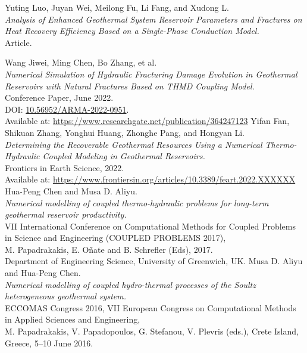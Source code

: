 \documentclass[a4paper,12pt]{report}
\begin{document}
\begin{thebibliography}{10}
  Yuting Luo, Juyan Wei, Meilong Fu, Li Fang, and Xudong L.\\
  \textit{Analysis of Enhanced Geothermal System Reservoir Parameters and Fractures on Heat Recovery Efficiency Based on a Single-Phase Conduction Model.}\\
  Article.

  Wang Jiwei, Ming Chen, Bo Zhang, et al.\\
  \textit{Numerical Simulation of Hydraulic Fracturing Damage Evolution in Geothermal Reservoirs with Natural Fractures Based on THMD Coupling Model.}\\ 
  Conference Paper, June 2022.\\
  DOI: \href{https://doi.org/10.56952/ARMA-2022-0951}{10.56952/ARMA-2022-0951}.\\
  Available at: \url{https://www.researchgate.net/publication/364247123}
  Yifan Fan, Shikuan Zhang, Yonghui Huang, Zhonghe Pang, and Hongyan Li.\\
  \textit{Determining the Recoverable Geothermal Resources Using a Numerical Thermo-Hydraulic Coupled Modeling in Geothermal Reservoirs.}\\
  Frontiers in Earth Science, 2022.\\
  Available at: \url{https://www.frontiersin.org/articles/10.3389/feart.2022.XXXXXX}
  Hua-Peng Chen and Musa D. Aliyu.\\
  \textit{Numerical modelling of coupled thermo-hydraulic problems for long-term geothermal reservoir productivity.}\\
  VII International Conference on Computational Methods for Coupled Problems in Science and Engineering (COUPLED PROBLEMS 2017),\\
  M. Papadrakakis, E. Oñate and B. Schrefler (Eds), 2017.\\
  Department of Engineering Science, University of Greenwich, UK.
  Musa D. Aliyu and Hua-Peng Chen.\\
  \textit{Numerical modelling of coupled hydro-thermal processes of the Soultz heterogeneous geothermal system.}\\
  ECCOMAS Congress 2016, VII European Congress on Computational Methods in Applied Sciences and Engineering,\\
  M. Papadrakakis, V. Papadopoulos, G. Stefanou, V. Plevris (eds.), Crete Island, Greece, 5–10 June 2016.\\

\end{thebibliography}
\end{document}

